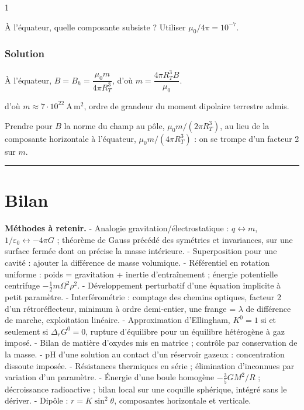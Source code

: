 \documentclass[11pt,a4paper]{article}
\newcommand{\equationajustee}[1]{%
  \sbox{\boiteequation}{$\displaystyle #1$}%
  \ifdim\wd\boiteequation>\linewidth
    \[\resizebox{\linewidth}{!}{\usebox{\boiteequation}}\]%
  \else
    \[#1\]%
  \fi}
\begin{document}
\begin{indication}{1}

À l'équateur, quelle composante subsiste ? Utiliser \(\mu_0/4\pi=10^{-7}\).

\end{indication}

\hypertarget{solution-32}{%
\subsubsection{Solution}\label{solution-32}}

À l'équateur, \(B=B_h=\dfrac{\mu_0m}{4\pi R_T^3}\), d'où \(\boxed{m=\dfrac{4\pi R_T^3B}{\mu_0}}\).

\equationajustee{\begin{aligned}
\log m&=20{,}43-4{,}59+7\\
&=22{,}84
\end{aligned}}

d'où \(\boxed{m\approx7\cdot10^{22}\ \mathrm{A\,m^2}}\), ordre de grandeur du moment dipolaire terrestre admis.

\begin{piege}

Prendre pour \(B\) la norme du champ au pôle, \(\mu_0m/(2\pi R_T^3)\), au lieu de la composante horizontale à l'équateur, \(\mu_0m/(4\pi R_T^3)\) : on se trompe d'un facteur 2 sur \(m\).

\end{piege}

\begin{center}\rule{0.5\linewidth}{0.5pt}\end{center}

\hypertarget{bilan}{%
\section{Bilan}\label{bilan}}

\textbf{Méthodes à retenir.}
- Analogie gravitation/électrostatique : \(q\leftrightarrow m\), \(1/\varepsilon_0\leftrightarrow-4\pi G\) ; théorème de Gauss précédé des symétries et invariances, sur une surface fermée dont on précise la masse intérieure.
- Superposition pour une cavité : ajouter la différence de masse volumique.
- Référentiel en rotation uniforme : poids = gravitation + inertie d'entraînement ; énergie potentielle centrifuge \(-\frac12m\Omega^2\rho^2\).
- Développement perturbatif d'une équation implicite à petit paramètre.
- Interférométrie : comptage des chemins optiques, facteur 2 d'un rétroréflecteur, minimum à ordre demi-entier, une frange = \(\lambda\) de différence de marche, exploitation linéaire.
- Approximation d'Ellingham, \(K^0=1\) si et seulement si \(\Delta_rG^0=0\), rupture d'équilibre pour un équilibre hétérogène à gaz imposé.
- Bilan de matière d'oxydes mis en matrice ; contrôle par conservation de la masse.
- pH d'une solution au contact d'un réservoir gazeux : concentration dissoute imposée.
- Résistances thermiques en série ; élimination d'inconnues par variation d'un paramètre.
- Énergie d'une boule homogène \(-\frac35GM^2/R\) ; décroissance radioactive ; bilan local sur une coquille sphérique, intégré sans le dériver.
- Dipôle : \(r=K\sin^2\theta\), composantes horizontale et verticale.
\end{document}
